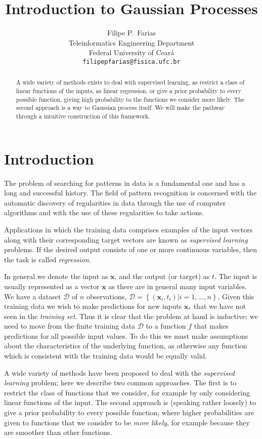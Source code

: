 \documentclass[11pt]{article} %
\title{Introduction to Gaussian Processes}
\author{
Filipe P.~Farias \\
Teleinformatics Engineering Department\\
Federal University of Ceará\\
\texttt{filipepfarias@fisica.ufc.br} \\
}
\begin{document}
\maketitle

\begin{abstract}
   A wide variety of methods exists to deal with supervised learning, as restrict a class of linear functions of the inputs, as linear regression, or give a prior probability to every possible function, giving high probability to the functions we consider more likely. The second approach is a way to Gaussian process itself. We will make the pathway through a intuitive construction of this framework.
\end{abstract}

\section{Introduction}

The problem of searching for patterns in data is a fundamental one and has a long and successful history. The field of pattern recognition is concerned with the automatic discovery of regularities in data through the use of computer algorithms and with the use of these regularities to take actions.

Applications in which the training data comprises examples of the input vectors along with their corresponding target vectors are known as \textit{supervised learning} problems. If the desired output consists of one or more continuous variables, then the task is called \textit{regression}\cite{Bishop:2006:PRM:1162264}.

In general we denote the input as $\mathbf{x}$, and the output (or target) as $t$. The input is usually represented as a vector $\mathbf{x}$ as there are in general many input variables. We have a dataset $\mathcal{D}$ of $n$ observations, $\mathcal{D}=\left\{\left(\mathbf{x}_{i}, t_{i}\right) | i=1, \ldots, n\right\}$. Given this training data we wish to make predictions for new inputs $\mathbf{x_*}$ that we have not seen in the \textit{training set}. Thus it is clear that the problem at hand is inductive; we need to move from the finite training data $\mathcal{D}$ to a function $f$ that makes predictions for all possible input values. To do this we must make assumptions about the characteristics of the underlying function, as otherwise any function which is consistent with the training data would be equally valid.

A wide variety of methods have been proposed to deal with the \textit{supervised learning} problem; here we describe two common approaches. The first is to restrict the class of functions that we consider, for example by only considering linear functions of the input. The second approach is (speaking rather loosely) to give a prior probability to every possible function, where higher probabilities are given to functions that we consider to be \textit{more likely}, for example because they are smoother than other functions. \cite{Rasmussen:2005:GPM:1162254}
\end{document}
